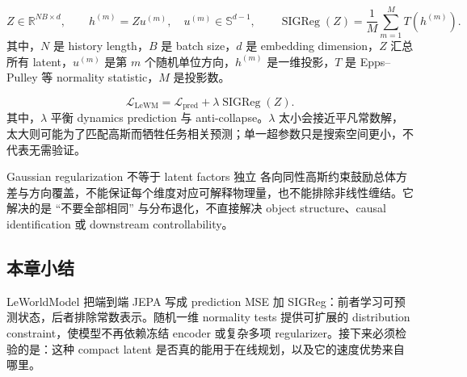 
\[
Z\in\mathbb{R}^{NB\times d},
\qquad
h^{(m)}=Zu^{(m)},\quad u^{(m)}\in\mathbb{S}^{d-1},
\qquad
\operatorname{SIGReg}(Z)=\frac{1}{M}\sum_{m=1}^{M}T\!\left(h^{(m)}\right).
\]
其中，$N$ 是 history length，$B$ 是 batch size，$d$ 是 embedding dimension，$Z$ 汇总所有 latent，$u^{(m)}$ 是第 $m$ 个随机单位方向，$h^{(m)}$ 是一维投影，$T$ 是 Epps--Pulley 等 normality statistic，$M$ 是投影数。

\[
\mathcal{L}_{\text{LeWM}}
=\mathcal{L}_{\text{pred}}+\lambda\operatorname{SIGReg}(Z).
\]
其中，$\lambda$ 平衡 dynamics prediction 与 anti-collapse。$\lambda$ 太小会接近平凡常数解，太大则可能为了匹配高斯而牺牲任务相关预测；单一超参数只是搜索空间更小，不代表无需验证。


\begin{warningbox}{Gaussian regularization 不等于 latent factors 独立}
各向同性高斯约束鼓励总体方差与方向覆盖，不能保证每个维度对应可解释物理量，也不能排除非线性缠结。它解决的是 ``不要全部相同'' 与分布退化，不直接解决 object structure、causal identification 或 downstream controllability。
\end{warningbox}

\subsection{本章小结}

LeWorldModel 把端到端 JEPA 写成 prediction MSE 加 SIGReg：前者学习可预测状态，后者排除常数表示。随机一维 normality tests 提供可扩展的 distribution constraint，使模型不再依赖冻结 encoder 或复杂多项 regularizer。接下来必须检验的是：这种 compact latent 是否真的能用于在线规划，以及它的速度优势来自哪里。

